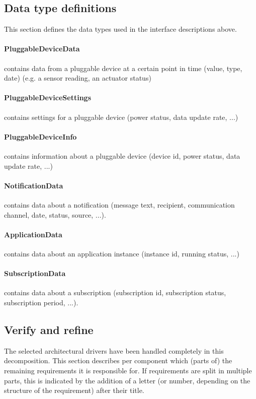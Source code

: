 \subsection{Data type definitions}
    This section defines the data types used in the interface descriptions above.

    \paragraph{PluggableDeviceData}
              contains data from a pluggable device at a certain point in time
              (value, type, date) (e.g. a sensor reading, an actuator status)
    \paragraph{PluggableDeviceSettings}
              contains settings for a pluggable device (power status,
              data update rate, ...)
    \paragraph{PluggableDeviceInfo}
              contains information about a pluggable device (device id,
              power status, data update rate, ...)
    \paragraph{NotificationData}
              contains data about a notification (message text, recipient,
              communication channel, date, status, source, ...).
    \paragraph{ApplicationData}
              contains data about an application instance (instance id, running status, ...)
    \paragraph{SubscriptionData}
              contains data about a subscription (subscription id, subscription status,
              subscription period, ...).


\subsection{Verify and refine}
    \noindent The selected architectural drivers have been handled completely
    in this decomposition.
    This section describes per component which (parts of) the remaining
    requirements it is responsible for. If requirements are split in
    multiple parts, this is indicated by the addition of a letter
    (or number, depending on the structure of the requirement) after their title.

